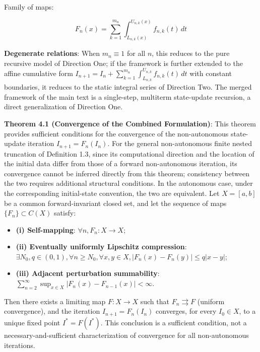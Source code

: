 \documentclass[11pt,a4paper]{amsart}
\begin{document}
Family of maps:

\begin{equation}
\label{eq:fn-def}
F_n(x) = \sum_{k=1}^{m_n} \int_{L_{n,k}(x)}^{U_{n,k}(x)} f_{n,k}(t) \, dt
\end{equation}

\textbf{Degenerate relations}: When $m_n \equiv 1$ for all $n$, this reduces to the pure recursive model of Direction One; if the framework is further extended to the affine cumulative form $I_{n+1} = I_n + \sum_{k=1}^{m_n} \int_{L_{n,k}}^{U_{n,k}} f_{n,k}(t) \, dt$ with constant boundaries, it reduces to the static integral series of Direction Two. The merged framework of the main text is a single-step, multiterm state-update recursion, a direct generalization of Direction One.

\textbf{Theorem 4.1 (Convergence of the Combined Formulation)}: This theorem provides sufficient conditions for the convergence of the non-autonomous state-update iteration $I_{n+1} = F_n(I_n)$. For the general non-autonomous finite nested truncation of Definition 1.3, since its computational direction and the location of the initial data differ from those of a forward non-autonomous iteration, its convergence cannot be inferred directly from this theorem; consistency between the two requires additional structural conditions. In the autonomous case, under the corresponding initial-state convention, the two are equivalent. Let $X = [a,b]$ be a common forward-invariant closed set, and let the sequence of maps $\{F_n\} \subset C(X)$ satisfy:

\begin{itemize}
\item \textbf{(i) Self-mapping}: $\forall n, F_n: X \to X$;
\item \textbf{(ii) Eventually uniformly Lipschitz compression}: $\exists N_0, q \in (0,1), \forall n \ge N_0, \forall x, y \in X, |F_n(x) - F_n(y)| \le q|x - y|$;
\item \textbf{(iii) Adjacent perturbation summability}: $\sum_{n=2}^\infty \sup_{x\in X}|F_n(x) - F_{n-1}(x)| < \infty$.
\end{itemize}

Then there exists a limiting map $F: X \to X$ such that $F_n \rightrightarrows F$ (uniform convergence), and the iteration $I_{n+1} = F_n(I_n)$ converges, for every $I_0 \in X$, to a unique fixed point $I^* = F(I^*)$. This conclusion is a sufficient condition, not a necessary-and-sufficient characterization of convergence for all non-autonomous iterations.
\end{document}
